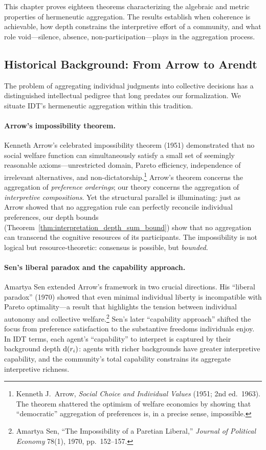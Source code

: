 This chapter proves eighteen theorems characterizing the algebraic and
metric properties of hermeneutic aggregation.  The results establish when
coherence is achievable, how depth constrains the interpretive effort of a
community, and what role void---silence, absence, non-participation---plays
in the aggregation process.

\subsection{Historical Background: From Arrow to Arendt}

The problem of aggregating individual judgments into collective decisions has
a distinguished intellectual pedigree that long predates our formalization.
We situate IDT's hermeneutic aggregation within this tradition.

\paragraph{Arrow's impossibility theorem.}
Kenneth Arrow's celebrated impossibility theorem (1951) demonstrated that no
social welfare function can simultaneously satisfy a small set of seemingly
reasonable axioms---unrestricted domain, Pareto efficiency, independence of
irrelevant alternatives, and non-dictatorship.\footnote{Kenneth J.\ Arrow,
\textit{Social Choice and Individual Values} (1951; 2nd ed.\ 1963).  The
theorem shattered the optimism of welfare economics by showing that
``democratic'' aggregation of preferences is, in a precise sense,
impossible.}  Arrow's theorem concerns the aggregation of \emph{preference
orderings}; our theory concerns the aggregation of \emph{interpretive
compositions}.  Yet the structural parallel is illuminating: just as Arrow
showed that no aggregation rule can perfectly reconcile individual
preferences, our depth bounds (Theorem~\ref{thm:interpretation_depth_sum_bound})
show that no aggregation can transcend the cognitive resources of its
participants.  The impossibility is not logical but resource-theoretic:
consensus is possible, but \emph{bounded}.

\paragraph{Sen's liberal paradox and the capability approach.}
Amartya Sen extended Arrow's framework in two crucial directions.  His
``liberal paradox'' (1970) showed that even minimal individual liberty is
incompatible with Pareto optimality---a result that highlights the tension
between individual autonomy and collective welfare.\footnote{Amartya Sen,
``The Impossibility of a Paretian Liberal,'' \textit{Journal of Political
Economy} 78(1), 1970, pp.\ 152--157.}  Sen's later ``capability approach''
shifted the focus from preference satisfaction to the substantive freedoms
individuals enjoy.  In IDT terms, each agent's ``capability'' to interpret
is captured by their background depth $\operatorname{d}(r_i)$: agents with richer
backgrounds have greater interpretive capability, and the community's total
capability constrains its aggregate interpretive richness.

